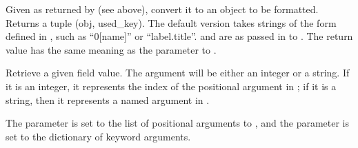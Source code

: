 \documentclass[letterpaper,10pt,english]{sphinxmanual}
\begin{document}
\begin{fulllineitems}
\begin{fulllineitems}
\label{\detokenize{string:string.Formatter.get_field}}
Given  as returned by {\hyperref[\detokenize{string:string.Formatter.parse}]{}} (see above), convert it to
an object to be formatted.  Returns a tuple (obj, used\_key).  The default
version takes strings of the form defined in , such as
“0{[}name{]}” or “label.title”.   and  are as passed in to
{\hyperref[\detokenize{string:string.Formatter.vformat}]{}}.  The return value  has the same meaning as the
 parameter to {\hyperref[\detokenize{string:string.Formatter.get_value}]{}}.

\end{fulllineitems}


\begin{fulllineitems}
\label{\detokenize{string:string.Formatter.get_value}}
Retrieve a given field value.  The  argument will be either an
integer or a string.  If it is an integer, it represents the index of the
positional argument in ; if it is a string, then it represents a
named argument in .

The  parameter is set to the list of positional arguments to
{\hyperref[\detokenize{string:string.Formatter.vformat}]{}}, and the  parameter is set to the dictionary of
keyword arguments.


\end{fulllineitems}
\end{fulllineitems}
\end{document}

